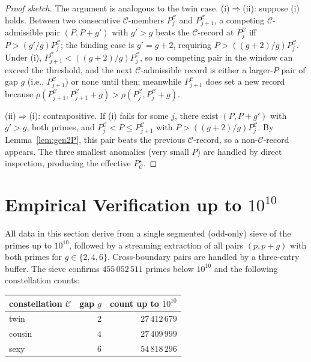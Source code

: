 \documentclass[11pt]{article}
\begin{document}
\begin{proof}[Proof sketch]
The argument is analogous to the twin case. (i)$\Rightarrow$(ii):
suppose (i) holds. Between two consecutive $\mathcal{C}$-members
$P^{\mathcal{C}}_j$ and $P^{\mathcal{C}}_{j+1}$, a competing
$\mathcal{C}$-admissible pair $(P,P+g')$ with $g'>g$ beats the
$\mathcal{C}$-record at $P^{\mathcal{C}}_j$ iff $P>(g'/g)P^{\mathcal{C}}_j$;
the binding case is $g'=g+2$, requiring
$P>((g+2)/g)P^{\mathcal{C}}_j$. Under (i),
$P^{\mathcal{C}}_{j+1}<((g+2)/g)P^{\mathcal{C}}_j$, so no competing
pair in the window can exceed the threshold, and the next
$\mathcal{C}$-admissible record is either a larger-$P$ pair of gap
$g$ (i.e., $P^{\mathcal{C}}_{j+1}$) or none until then; meanwhile
$P^{\mathcal{C}}_{j+1}$ does set a new record because
$\rho(P^{\mathcal{C}}_{j+1},P^{\mathcal{C}}_{j+1}+g)>
\rho(P^{\mathcal{C}}_j,P^{\mathcal{C}}_j+g)$.

(ii)$\Rightarrow$(i): contrapositive. If (i) fails for some $j$,
there exist $(P,P+g')$ with $g'>g$, both primes, and
$P^{\mathcal{C}}_j<P\le P^{\mathcal{C}}_{j+1}$ with
$P>((g+2)/g)P^{\mathcal{C}}_j$. By
Lemma~\ref{lem:gen2P}, this pair beats the previous
$\mathcal{C}$-record, so a non-$\mathcal{C}$-record appears. The
three smallest anomalies (very small $P$) are handled by direct
inspection, producing the effective $P^{\star}_\mathcal{C}$.
\end{proof}

\section{Empirical Verification up to $10^{10}$}\label{sec:empirical}

All data in this section derive from a single segmented (odd-only)
sieve of the primes up to $10^{10}$, followed by a streaming
extraction of all pairs $(p,p+g)$ with both primes for
$g\in\{2,4,6\}$. Cross-boundary pairs are handled by a three-entry
buffer. The sieve confirms $455\,052\,511$ primes below $10^{10}$
and the following constellation counts:

\begin{center}
\begin{tabular}{lrr}
\toprule
constellation $\mathcal{C}$ & gap $g$ & count up to $10^{10}$ \\
\midrule
twin & 2 & $27\,412\,679$ \\
cousin & 4 & $27\,409\,999$ \\
sexy & 6 & $54\,818\,296$ \\
\bottomrule
\end{tabular}
\end{center}
\end{document}
